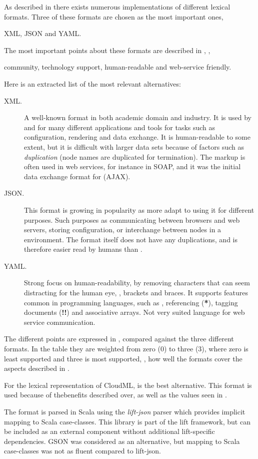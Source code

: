 As described in  there exists numerous implementations of different lexical formats.
Three of these formats are chosen as the most important ones,
\begin{ii}
  \iitem XML,
  \iitem JSON and
  \iitem YAML.
\end{ii}
The most important points about these formats are described in ,
\ie,
\begin{ii}
  \iitem community,
  \iitem technology support,
  \iitem human-readable and
  \iitem web-service friendly.
\end{ii}
Here is an extracted list of the most relevant alternatives:
\begin{description}
  \item[XML.] A well-known format in both academic domain and industry.
    It is used by and for many different applications and tools for tasks such as configuration,
    rendering and data exchange.
    It is human-readable to some extent, but it is difficult with larger data sets because
    of factors such as \emph{duplication} (node names are duplicated for termination). 
    The markup is often used in web services, for instance in SOAP, 
    and it was the initial data exchange format for  (AJAX).
  \item[JSON.] This format is growing in popularity as more adapt to using it for
    different purposes.
    Such purposes as communicating between browsers and web servers, storing configuration,
    or interchange between nodes in a  environment.
    The format itself does not have any duplications, and is therefore easier read by humans
    than .
  \item[YAML.] Strong focus on human-readability, by removing characters that can seem
    distracting for the human eye, \eg, brackets and braces.
    It supports features common in programming languages, such as
    \eg, referencing (\textbf{*}), tagging documents (\textbf{!!}) and associative arrays.
    Not very suited language for web service communication.
\end{description}
The different points are expressed in , 
compared against the three different formats.
In the table they are weighted from zero ($0$) to three ($3$),
where zero is least supported and three is most supported,
\ie, how well the formats cover the aspects described in .

For the lexical representation of CloudML,  is the best alternative.
This format is used because of thebenefits described over,
as well as the values seen in .


The  format is parsed in Scala using the \emph{lift-json} parser which provides implicit
mapping to Scala case-classes. This library is part of the lift framework,
but can be included as an external component without additional lift-specific dependencies.
GSON was considered as an alternative, but mapping to Scala case-classes was not as 
fluent compared to lift-json.


